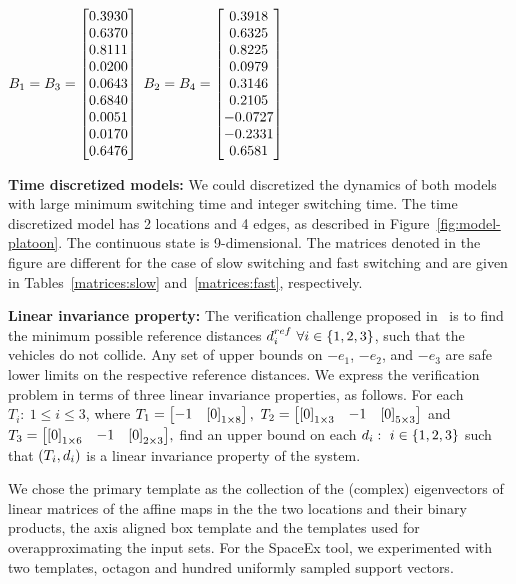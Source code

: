 \begin{table}
{$B_1=B_3=\left[\begin{matrix}0.3930\\
    0.6370\\
    0.8111\\
    0.0200\\
    0.0643\\
    0.6840\\
    0.0051\\
    0.0170\\
    0.6476\\
\end{matrix}\right]$
$B_2=B_4=\left[\begin{matrix}0.3918\\
    0.6325\\
    0.8225\\
    0.0979\\
    0.3146\\
    0.2105\\
   -0.0727\\
   -0.2331\\
    0.6581\end{matrix}\right]$
}
\end{table}
%

{\bf Time discretized models: } We could discretized the dynamics of
both models with large minimum switching time and integer switching
time.  The time discretized model has 2 locations and 4 edges, as
described in Figure~\ref{fig:model-platoon}.  The continuous state is
9-dimensional.  The matrices denoted in the figure are different for
the case of slow switching and fast switching and are given in
Tables~\ref{matrices:slow} and~\ref{matrices:fast}, respectively.


{\bf Linear invariance property: } The verification challenge proposed
in~\cite{makhlouf2014networked} is to find the minimum possible
reference distances $d_i^{ref}~\forall i\in\left\{1,2,3\right\}$, such that the
vehicles do not collide.  Any set of upper bounds on $-e_1$, $-e_2$,
and $-e_3$ are safe lower limits on the respective reference
distances.  We express the verification problem in terms of three
linear invariance properties, as follows.  For each ${T_i:~1\leq i\leq
3}$, where
%
$ T_1=\left[\begin{matrix}-1 & \left[0\right]_{1\times 8}\end{matrix}\right],~
T_2=\left[\begin{matrix}\left[0\right]_{1\times 3} & -1 &\left[0\right]_{5\times 3}\end{matrix}\right]$ and
 ${T_3=\left[\begin{matrix}\left[0\right]_{1\times 6}& -1 &\left[0\right]_{2\times 3}\end{matrix}\right]},
$
%
find an upper bound on each $d_i:~i\in\left\{1,2,3\right\}$ such that
$\left(T_i,d_i\right)$ is a linear invariance property of the system.

  We chose the primary template
as the collection of the (complex) eigenvectors of linear matrices of
the affine maps in the the two locations and their binary products,
the axis aligned box template and the templates used for
overapproximating the input sets. For the SpaceEx tool, we
experimented with two templates, octagon and hundred uniformly sampled
support vectors.

